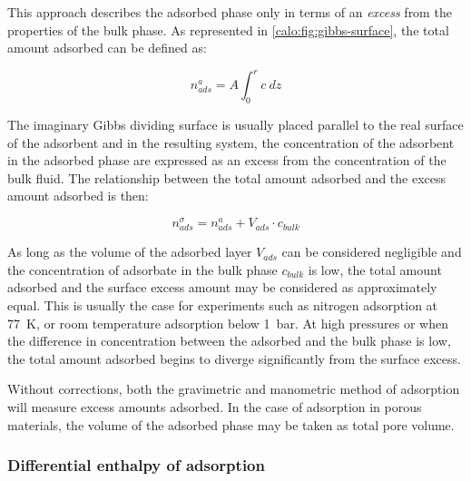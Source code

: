 This approach describes the adsorbed phase only in terms
of an \textit{excess} from the properties of the bulk phase.
As represented in \autoref{calo:fig:gibbs-surface}, the total
amount adsorbed can be defined as:

\begin{equation}
  n_{ads}^{a} = A \int_0^r c\ dz
\end{equation}

The imaginary Gibbs dividing surface is usually placed parallel to
the real surface of the adsorbent and in the resulting system, the
concentration of the adsorbent in the adsorbed phase are 
expressed as an excess from the concentration of the bulk fluid.
The relationship between the total amount adsorbed and the 
excess amount adsorbed is then:

\begin{equation}
  n_{ads}^{\sigma} = n_{ads}^{a} + V_{ads} \cdot c_{bulk}
\end{equation}

As long as the volume of the adsorbed layer \(V_{ads}\) can be 
considered negligible and the concentration of adsorbate in the bulk 
phase \(c_{bulk}\) is low, the total amount adsorbed and the surface 
excess amount may be considered as approximately equal.
This is usually the case for experiments such as nitrogen 
adsorption at \SI{77}{\kelvin}, or room temperature adsorption
below \SI{1}{\bar}.
At high pressures or when the difference in concentration between
the adsorbed and the bulk phase is low, the total amount adsorbed
begins to diverge significantly from the surface excess. 

Without corrections, both the gravimetric and manometric
method of adsorption will measure excess amounts adsorbed.
In the case of adsorption in porous materials, the volume of the
adsorbed phase may be taken as total pore volume. 

\subsubsection{Differential enthalpy of adsorption}

